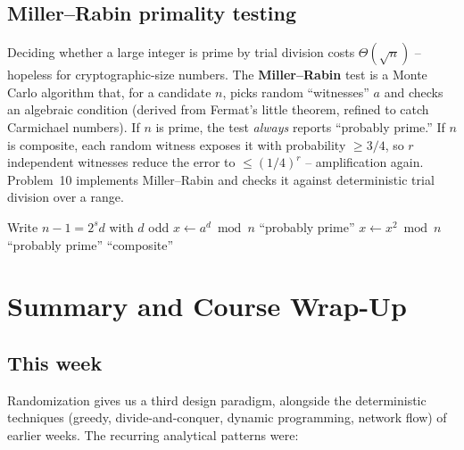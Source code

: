 \documentclass[11pt]{article}
\begin{document}
\subsection{Miller--Rabin primality testing}

Deciding whether a large integer is prime by trial division costs $\Theta(\sqrt n)$
-- hopeless for cryptographic-size numbers. The \textbf{Miller--Rabin} test is a
Monte Carlo algorithm that, for a candidate $n$, picks random ``witnesses'' $a$ and
checks an algebraic condition (derived from Fermat's little theorem, refined to
catch Carmichael numbers). If $n$ is prime, the test \emph{always} reports
``probably prime.'' If $n$ is composite, each random witness exposes it with
probability $\ge 3/4$, so $r$ independent witnesses reduce the error to $\le
(1/4)^r$ -- amplification again. Problem~10 implements Miller--Rabin and checks it
against deterministic trial division over a range.

\begin{algorithm}[h]
\caption{Miller--Rabin (one witness $a$ for odd $n > 2$)}
\begin{algorithmic}[1]
\State Write $n - 1 = 2^{s} d$ with $d$ odd
\State $x \gets a^{d} \bmod n$
 \Return ``probably prime'' \EndIf
{}
    \State $x \gets x^{2} \bmod n$
     \Return ``probably prime'' \EndIf
\EndFor
\State \Return ``composite''
\end{algorithmic}
\end{algorithm}

\section{Summary and Course Wrap-Up}

\subsection{This week}

Randomization gives us a third design paradigm, alongside the deterministic
techniques (greedy, divide-and-conquer, dynamic programming, network flow) of
earlier weeks. The recurring analytical patterns were:
\end{document}

